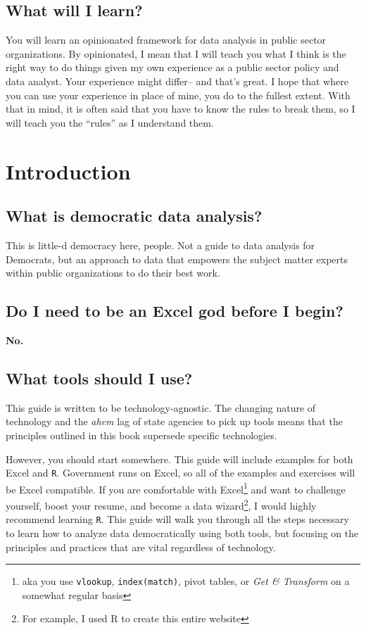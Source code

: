 \documentclass[]{book}
\begin{document}
\section*{What will I learn?}\label{what-will-i-learn}

You will learn an opinionated framework for data analysis in public
sector organizations. By opinionated, I mean that I will teach you what
I think is the right way to do things given my own experience as a
public sector policy and data analyst. Your experience might differ--
and that's great. I hope that where you can use your experience in place
of mine, you do to the fullest extent. With that in mind, it is often
said that you have to know the rules to break them, so I will teach you
the ``rules'' as I understand them.

\chapter{Introduction}\label{intro}

\section{What is democratic data
analysis?}\label{what-is-democratic-data-analysis}

This is little-d democracy here, people. Not a guide to data analysis
for Democrats, but an approach to data that empowers the subject matter
experts within public organizations to do their best work.

\section{Do I need to be an Excel god before I
begin?}\label{do-i-need-to-be-an-excel-god-before-i-begin}

\textbf{No.}

\section{What tools should I use?}\label{what-tools-should-i-use}

This guide is written to be technology-agnostic. The changing nature of
technology and the \emph{ahem} lag of state agencies to pick up tools
means that the principles outlined in this book supersede specific
technologies.

However, you should start somewhere. This guide will include examples
for both Excel and \texttt{R}. Government runs on Excel, so all of the
examples and exercises will be Excel compatible. If you are comfortable
with Excel\footnote{aka you use \texttt{vlookup}, \texttt{index(match)},
  pivot tables, or \emph{Get \& Transform} on a somewhat regular basis}
and want to challenge yourself, boost your resume, and become a data
wizard\footnote{For example, I used R to create this entire website}, I
would highly recommend learning \texttt{R}. This guide will walk you
through all the steps necessary to learn how to analyze data
democratically using both tools, but focusing on the principles and
practices that are vital regardless of technology.
\end{document}
